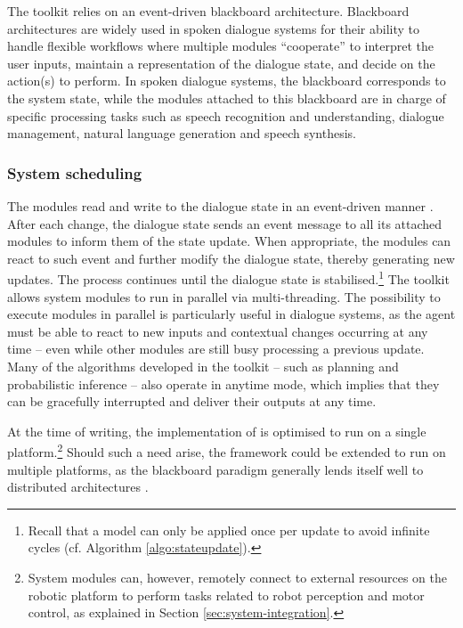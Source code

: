 The \opendial{} toolkit relies on an event-driven blackboard architecture. Blackboard architectures are widely used in spoken dialogue systems for their ability to handle flexible workflows where multiple modules ``cooperate'' to  interpret the user inputs, maintain a representation of the dialogue state, and decide on the action(s) to perform. In spoken dialogue systems, the blackboard corresponds to the system state, while the modules attached to this blackboard are in charge of specific processing tasks such as speech recognition and understanding, dialogue management, natural language generation and speech synthesis. 


\subsubsection*{System scheduling}

The modules read and write to the dialogue state in an event-driven manner . After each change, the dialogue state sends an event message to all its attached modules to inform them of the state update. When appropriate, the modules can react to such event and further modify the dialogue state, thereby generating new updates. The process continues until the dialogue state is stabilised.\footnote{Recall that a model can only be applied once per update to avoid infinite cycles (cf. Algorithm \ref{algo:stateupdate}).}   The \opendial{} toolkit allows system modules to run in parallel via multi-threading. The possibility to execute modules in parallel is particularly useful in dialogue systems, as the agent must be able to react to new inputs and contextual changes occurring at any time -- even while other modules are still busy processing a previous update.  Many of the algorithms developed in the toolkit -- such as planning and probabilistic inference -- also operate in anytime mode, which implies that they can be gracefully interrupted and deliver their outputs at any time.

At the time of writing, the implementation of \opendial{} is optimised to run on a single platform.\footnote{System modules can, however, remotely connect to external resources on the robotic platform to perform tasks related to robot perception and motor control, as explained in Section \ref{sec:system-integration}.} Should such a need arise, the framework could be extended to run on multiple platforms, as the blackboard paradigm generally lends itself well to distributed architectures \citep{Corkill:1989}.

